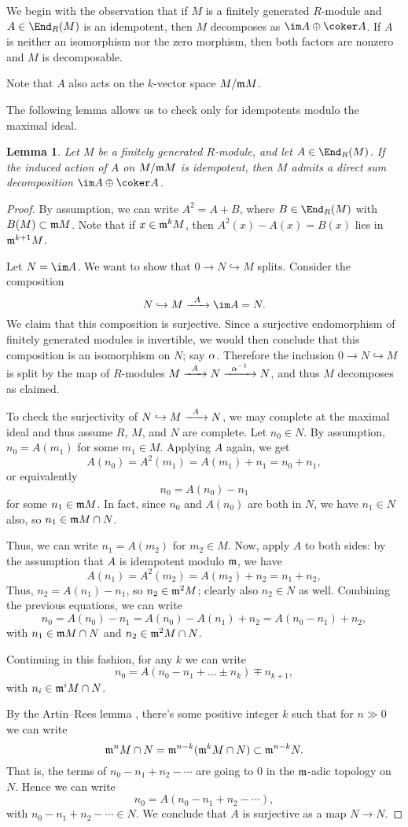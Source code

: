 \documentclass[12pt]{article}
\let\inc\hookrightarrow
\theoremstyle{theorem}
\numberwithin{thm}{section}
\newtheorem{lem}[thm]{Lemma}
\theoremstyle{definition}
\begin{document}
We begin with the observation that if $M$ is a finitely generated $R$-module and $A\in\End_R(M)$ is an idempotent, then $M$ decomposes as $\im A \oplus \coker A$. If $A$ is neither an isomorphism nor the zero morphism, then both factors are nonzero and $M$ is decomposable.

Note that $A$ also acts on the $k$-vector space $M/\mathfrak m M$.

The following lemma allows us to check only for idempotents modulo the maximal ideal.

\begin{lem}\label{lem:idemp}
  Let $M$ be a finitely generated $R$-module, and let $A\in\End_R(M)$. If the induced action of $A$ on $M/\mathfrak m M$ is idempotent, then $M$ admits a direct sum decomposition $\im A \oplus \coker A$.
\end{lem}
\begin{proof}
  By assumption, we can write $A^2 = A + B$, where $B\in\End_R(M)$ with $B(M)\subset \mathfrak m M$.
  Note that if $x \in \mathfrak m^kM$, then $A^2(x) - A(x) = B(x)$ lies in $\mathfrak m^{k+1}M$.

  Let $N = \im A$. We want to show that $0 \to N\inc M$ splits. Consider the composition
  \[ N\inc M \xra{A} \im A = N.\]
  We claim that this composition is surjective. Since a surjective endomorphism of finitely generated modules is invertible, we would then conclude that this composition is an isomorphism on $N$; say $\alpha$.
  Therefore the inclusion \( 0 \to N \inc M \) is split by the map of $R$-modules $M\xra{A} N\xra{\a\inv} N$, and thus $M$ decomposes as claimed.

  To check the surjectivity of $N\inc M \xra{A} N$,  we may complete at the maximal ideal and thus assume $R$, $M$, and $N$ are complete. Let $n_0\in N$. By assumption, $n_0=A(m_1)$ for some $m_1\in M$. Applying $A$ again, we get
  \[ A(n_0) = A^2(m_1) = A(m_1) + n_1 = n_0 + n_1, \]
  or equivalently
  \[ n_0 = A(n_0) - n_1 \]
  for some $n_1\in \mathfrak m M$. In fact, since $n_0$ and $A(n_0)$ are both in $N$, we have $n_1\in N$ also, so $n_1\in \mathfrak m M\cap N$.

  Thus, we can write $n_1 = A(m_2)$ for $m_2\in M$.
  Now, apply $A$ to both sides: by the assumption that $A$ is idempotent modulo $\mathfrak m$, we have
  \[ A(n_1)=A^2(m_2) = A(m_2) + n_2 = n_1+n_2, \]
  Thus, $n_2=A(n_1)-n_1$, so $n_2\in \mathfrak m^2M$; clearly also $n_2\in N$ as well.
  Combining the previous equations, we can write
  \[ n_0 = A(n_0) - n_1 = A(n_0) - A(n_1) + n_2 = A(n_0 - n_1) + n_2, \]
  with $n_1\in \mathfrak m M\cap N$ and $n_2\in \mathfrak m^2M\cap N$.

  Continuing in this fashion, for any $k$ we can write
  \[ n_0=A(n_0-n_1+\dots \pm n_k) \mp n_{k+1}, \]
  with $n_i \in \mathfrak m^i M\cap N$.

  By the Artin--Rees lemma \cite[Lemma~5.1]{Eisenbud95}, there's some positive integer $k$ such that for $n\gg0$ we can write
  \[ \mathfrak m^n M\cap N = \mathfrak m^{n-k} ( \mathfrak m^kM\cap N)\subset \mathfrak m^{n-k} N. \]
  That is, the terms of $n_0-n_1+n_2-\cdots$ are going to 0 in the $\mathfrak m$-adic topology on $N$. Hence we can write
  \[ n_0=A(n_0-n_1+n_2-\cdots), \]
  with $n_0-n_1+n_2-\cdots\in N$. We conclude that $A$ is surjective as a map $N\to N$.
\end{proof}
\end{document}
